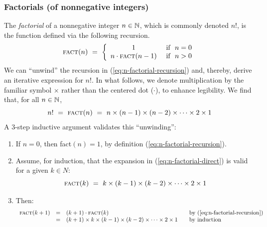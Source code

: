 \subsubsection{Factorials (of nonnegative integers)}


The {\it factorial} of a nonnegative integer $n \in \mathbb{N}$, which is commonly denoted $n!$, is the function defined via the following recursion.
\begin{equation}
\label{eq:n-factorial-recursion}
\mbox{\sc fact}(n) \ = \ \left\{
\begin{array}{cl}
1 & \mbox{  if } \ n=0 \\
n \cdot \mbox{\sc fact}(n-1) & \mbox{  if } \ n>0
\end{array}
\right.
\end{equation}
We can ``unwind'' the recursion in (\ref{eq:n-factorial-recursion}) and, thereby, derive an iterative expression for $n!$.  In what follows, we denote multiplication by the familiar symbol $\times$ rather than the centered dot ($\cdot$), to enhance legibility.  We find that, for all $n \in \mathbb{N}$,
\begin{equation}
\label{eq:n-factorial-direct}
n! \ = \ \mbox{\sc fact}(n) \ = \ 
n \times (n-1) \times (n-2) \times \cdots \times 2 \times 1
\end{equation} 
A $3$-step inductive argument validates this ``unwinding'':
\begin{enumerate}
\item
If $n =0$, then {\sc fact}$(n) = 1$, by definition (\ref{eq:n-factorial-recursion}).
\item
Assume, for induction, that the expansion in (\ref{eq:n-factorial-direct}) is valid for a given $k \in N$:
\[ \mbox{\sc fact}(k) \ = \ k \times (k-1) \times (k-2) \times \cdots \times 2 \times 1 \] 
\item
Then:
\[
\begin{array}{lclll}
\mbox{\sc fact}(k+1) & = & (k+1) \cdot \mbox{\sc fact}(k)
  & & \mbox{by (\ref{eq:n-factorial-recursion})} \\
  & = &
(k+1) \times k \times (k-1) \times (k-2) \times \cdots \times 2 \times 1
  & & \mbox{by induction}
\end{array}
\]
\end{enumerate}



